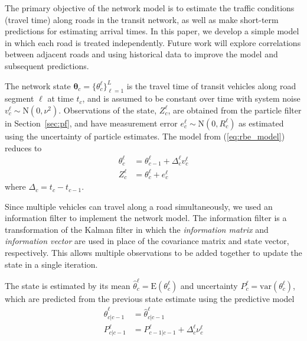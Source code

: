 The primary objective of the network model is to estimate the \rt traffic conditions
(travel time) along roads in the transit network, 
as well as make short-term predictions for estimating arrival times.
In this paper, we develop a simple model in which each road is treated independently.
Future work will explore correlations between adjacent roads and using historical data
to improve the model and subsequent predictions.


The network state $\boldsymbol\theta_c = \{\theta_c^\ell\}_{\ell = 1}^L$ is the travel time 
of transit vehicles along road segment $\ell$ at time $t_c$,
and is assumed to be constant over time 
with system noise $v_c^\ell \sim \mathrm{N}(0, \nu^2)$.
Observations of the state, $Z_c^\ell$, are obtained from the particle filter in Section~\ref{sec:pf},
and have measurement error $e_c^\ell \sim \mathrm{N}(0, R_c^\ell)$ as estimated 
using the uncertainty of particle estimates.
The model from (\ref{eq:rbe_model}) reduces to
\begin{equation*}
\begin{split}
\theta_c^\ell &= \theta_{c-1}^\ell + \Delta_c^\ell v_c^\ell \\
Z_c^\ell &= \theta_c^\ell + e_c^\ell
\end{split}
\end{equation*}
where $\Delta_c = t_c - t_{c-1}$.


Since multiple vehicles can travel along a road simultaneously,
we used an information filter to implement the network model.
The information filter is a transformation of the Kalman filter in which the
\emph{information matrix} and \emph{information vector} are used in place of 
the covariance matrix and state vector, respectively.
This allows multiple observations to be added together to update the state
in a single iteration.


The state is estimated by its mean $\hat \theta_c^\ell = \mathrm{E}(\theta_c^\ell)$
and uncertainty $P_c^\ell = \mathrm{var}(\theta_c^\ell)$,
which are predicted from the previous state estimate using the predictive model
\begin{align*}
\label{eq:kf_transition}
\hat \theta^\ell_{c|c-1} &= \hat \theta^\ell_{c|c-1} \\
P^\ell_{c|c-1} &= P^\ell_{c-1|c-1} + \Delta_c^\ell \nu_c^\ell
\end{align*}

